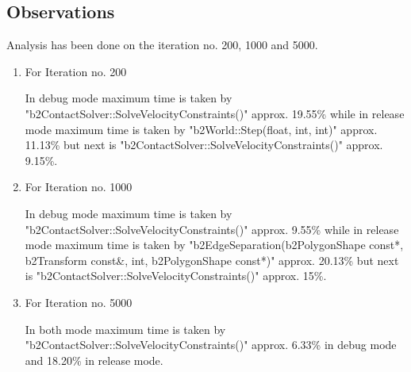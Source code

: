 \documentclass[a4paper,11pt]{article}
\begin{document}
\subsection{Observations}
Analysis has been done on the iteration no. 200, 1000 and 5000.
\begin{enumerate}
\item{For Iteration no. 200}
\begin{description} In debug mode maximum time is taken by "b2ContactSolver::SolveVelocityConstraints()" approx. 19.55\% while in release mode maximum time is taken by "b2World::Step(float, int, int)" approx. 11.13\% but next is "b2ContactSolver::SolveVelocityConstraints()" approx. 9.15\%.
\end{description}

\item{For Iteration no. 1000}
\begin{description} In debug mode maximum time is taken by "b2ContactSolver::SolveVelocityConstraints()" approx. 9.55\% while in release mode maximum time is taken by "b2EdgeSeparation(b2PolygonShape const*, b2Transform const\&, int, b2PolygonShape const*)" approx. 20.13\% but next is "b2ContactSolver::SolveVelocityConstraints()" approx. 15\%.
\end{description}

\item{For Iteration no. 5000}
\begin{description} In both mode maximum time is taken by "b2ContactSolver::SolveVelocityConstraints()" approx. 6.33\% in debug mode and 18.20\% in release mode.
\end{description}

\end{enumerate}
\end{document}
